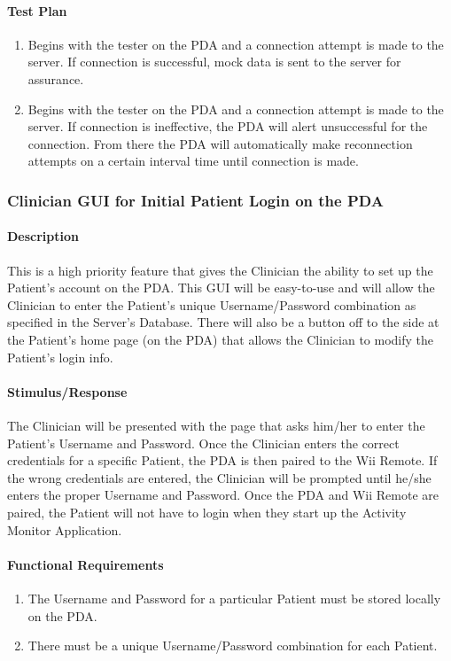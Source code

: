 \documentclass{article}
\begin{document}
\paragraph {Test Plan}
\begin{enumerate}
\item Begins with the tester on the PDA and a connection attempt is made to the server.  If connection is successful, mock data is sent to the server for assurance.
\item Begins with the tester on the PDA and a connection attempt is made to the server.  If connection is ineffective, the PDA will alert unsuccessful for the connection.  From there the PDA will automatically make reconnection attempts on a certain interval time until connection is made. 
\end{enumerate}

\subsubsection {Clinician GUI for Initial Patient Login on the PDA}\label{sec: Clinician GUI}
\paragraph {Description}
This is a high priority feature that gives the Clinician the ability to set up the Patient's account on the PDA. This GUI will be easy-to-use and will allow the Clinician to enter the Patient's unique Username/Password
combination as specified in the Server's Database. There will also be a button off to the side at the Patient's home page (on the PDA) that allows the Clinician to modify the Patient's login info.
 
\paragraph {Stimulus/Response}
The Clinician will be presented with the page that asks him/her to enter the Patient's Username and Password. Once the Clinician enters the correct credentials for a specific Patient, the PDA is then paired to the Wii Remote. 
If the wrong credentials are entered, the Clinician will be prompted until he/she enters the proper Username and Password. Once the PDA and Wii Remote are paired, the Patient will not have to login when they start up the Activity Monitor Application.

\paragraph {Functional Requirements}
\begin{enumerate}
\item The Username and Password for a particular Patient must be stored locally on the PDA. 
\item There must be a unique Username/Password combination for each Patient.
\end{enumerate}
\end{document}
